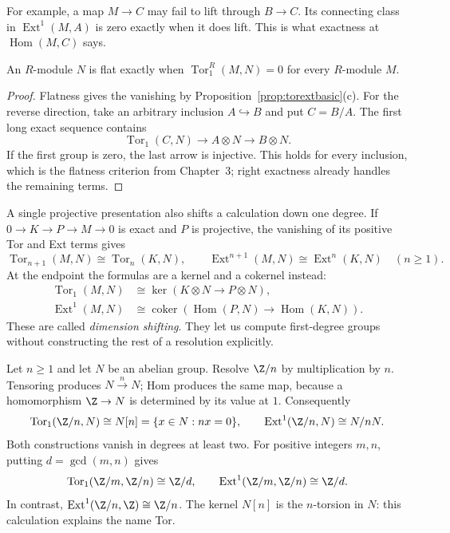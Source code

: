 For example, a map $M\to C$ may fail to lift through $B\to C$. Its connecting class in $\operatorname{Ext}^1(M,A)$ is zero exactly when it does lift. This is what exactness at $\operatorname{Hom}(M,C)$ says.

\begin{corollary}\label{cor:torflat}
An $R$-module $N$ is flat exactly when
$\operatorname{Tor}_1^R(M,N)=0$ for every $R$-module $M$.
\end{corollary}

\begin{proof}
Flatness gives the vanishing by Proposition~\ref{prop:torextbasic}(c). For the reverse direction, take an arbitrary inclusion $A\hookrightarrow B$ and put $C=B/A$. The first long exact sequence contains
\[
\operatorname{Tor}_1(C,N)\longrightarrow A\otimes N\longrightarrow B\otimes N.
\]
If the first group is zero, the last arrow is injective. This holds for every inclusion, which is the flatness criterion from Chapter~3; right exactness already handles the remaining terms.
\end{proof}

A single projective presentation also shifts a calculation down one degree. If
$0\to K\to P\to M\to0$ is exact and $P$ is projective, the vanishing of its positive Tor and Ext terms gives
\[
\operatorname{Tor}_{n+1}(M,N)\cong\operatorname{Tor}_n(K,N),\qquad
\operatorname{Ext}^{n+1}(M,N)\cong\operatorname{Ext}^n(K,N)
\quad(n\ge1).
\]
At the endpoint the formulas are a kernel and a cokernel instead:
\[
\begin{aligned}
\operatorname{Tor}_1(M,N)&\cong\ker(K\otimes N\to P\otimes N),\\
\operatorname{Ext}^1(M,N)&\cong
\operatorname{coker}(\operatorname{Hom}(P,N)\to\operatorname{Hom}(K,N)).
\end{aligned}
\]
These are called \emph{dimension shifting}. They let us compute first-degree groups without constructing the rest of a resolution explicitly.

\begin{example}\label{ex:torextz}
Let $n\ge1$ and let $N$ be an abelian group. Resolve $\Z/n$ by multiplication by $n$. Tensoring produces $N\xrightarrow{n}N$; Hom produces the same map, because a homomorphism $\Z\to N$ is determined by its value at $1$. Consequently
\[
\operatorname{Tor}_1(\Z/n,N)\cong N[n]=\{x\in N:nx=0\},\qquad
\operatorname{Ext}^1(\Z/n,N)\cong N/nN.
\]
Both constructions vanish in degrees at least two. For positive integers $m,n$, putting $d=\gcd(m,n)$ gives
\[
\operatorname{Tor}_1(\Z/m,\Z/n)\cong\Z/d,
\qquad \operatorname{Ext}^1(\Z/m,\Z/n)\cong\Z/d.
\]
In contrast, $\operatorname{Ext}^1(\Z/n,\Z)\cong\Z/n$. The kernel $N[n]$ is the $n$-torsion in $N$: this calculation explains the name Tor.
\end{example}

